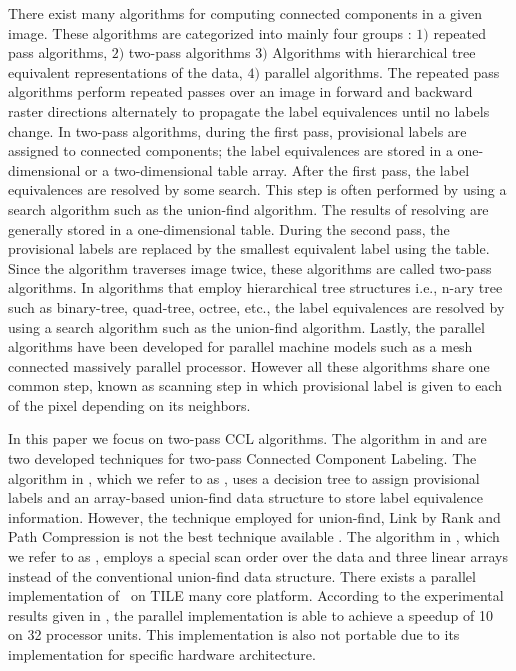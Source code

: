 There exist many algorithms for computing connected components in a given image. These algorithms are categorized into
mainly four groups %
\cite{Suzuki2003_Linear}
: $1)$ repeated pass
algorithms\cite{Haralick1981_Repeated,Hashizume1990_Algorithm}, $2)$ two-pass
algorithms\cite{gotoh1990high,gotoh1987component,komeichi1989video,lumia1983new,lumia1983new_c,naoi1995high,rosenfeld1970connectivity,
rosenfeld1966sequential,shirai1987labeling}
$3)$ Algorithms with hierarchical tree equivalent representations of the
data\cite{dillencourt1992general,gargantini1982separation,hecquard1991connected,samet1981connected,samet1985computing,samet1988efficient,
samet1986improved,tamminen1984efficient},
$4)$ parallel
algorithms\cite{bhattacharya1996connected,choudhary1994connected,
hirschberg1979computing,manohar1989connected,nassimi1980finding,olariu1993fast}.
The repeated pass algorithms perform repeated passes over an image in forward and backward raster directions alternately
to propagate the label equivalences until no labels change.
In two-pass algorithms, during the first pass, provisional labels are assigned to connected components;
the label equivalences are stored in a one-dimensional or a two-dimensional table array. After the first pass, the label 
equivalences are resolved by some search. This step is often performed by using
a search algorithm such as the union-find algorithm.
The results of resolving are generally stored in a one-dimensional table. During the second pass, the provisional labels are 
replaced by the smallest equivalent label using the table. Since the algorithm traverses image twice, these algorithms 
are called two-pass algorithms.
In algorithms that employ hierarchical tree structures i.e., n-ary tree such as binary-tree, quad-tree, octree, etc., the
label equivalences are resolved by using a search algorithm such as the union-find algorithm.
Lastly, the parallel algorithms have been developed for parallel machine models such as a mesh connected massively parallel processor.
However all these algorithms share one common step, known as scanning step in
which provisional label is given to each of the pixel depending on its neighbors.

In this paper we focus on two-pass CCL algorithms. The algorithm in \cite{Wu2009_LRPC} and \cite{He2012_ARun} are two
developed techniques for two-pass Connected Component Labeling.
The algorithm in \cite{Wu2009_LRPC}, which we refer to as \lrpc, uses a decision tree to assign provisional labels and an 
array-based union-find data structure
to store label equivalence information. However, the technique employed for
union-find, Link by Rank and Path Compression is not the best technique available \cite{Patwary2012_PARemSP}. 
The algorithm in \cite{He2012_ARun}, which we refer to as \arun, employs a special scan order over the data and three linear
arrays instead of the conventional union-find data structure. There
exists a parallel implementation of \arun\ on TILE many core
platform\cite{Chen2013_PARun}. According to the
experimental results given in \cite{Chen2013_PARun}, the parallel implementation is able to achieve a speedup of 10 on
32 processor units. 
This implementation is also not portable due to its implementation for specific hardware architecture.


